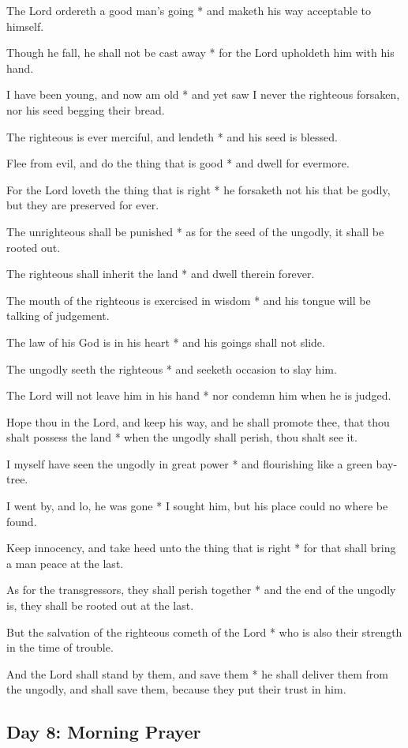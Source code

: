 The Lord ordereth a good man's going * and maketh his way acceptable to himself.

Though he fall, he shall not be cast away * for the Lord upholdeth him with his hand.

I have been young, and now am old * and yet saw I never the righteous forsaken, nor his seed begging their bread.

The righteous is ever merciful, and lendeth * and his seed is blessed.

Flee from evil, and do the thing that is good * and dwell for evermore.

For the Lord loveth the thing that is right * he forsaketh not his that be godly, but they are preserved for ever.

The unrighteous shall be punished * as for the seed of the ungodly, it shall be rooted out.

The righteous shall inherit the land * and dwell therein forever.

The mouth of the righteous is exercised in wisdom * and his tongue will be talking of judgement.

The law of his God is in his heart * and his goings shall not slide.

The ungodly seeth the righteous * and seeketh occasion to slay him.

The Lord will not leave him in his hand * nor condemn him when he is judged.

Hope thou in the Lord, and keep his way, and he shall promote thee, that thou shalt possess the land * when the ungodly shall perish, thou shalt see it.

I myself have seen the ungodly in great power * and flourishing like a green bay-tree.

I went by, and lo, he was gone * I sought him, but his place could no where be found.

Keep innocency, and take heed unto the thing that is right * for that shall bring a man peace at the last.

As for the transgressors, they shall perish together * and the end of the ungodly is, they shall be rooted out at the last.

But the salvation of the righteous cometh of the Lord * who is also their strength in the time of trouble.

And the Lord shall stand by them, and save them * he shall deliver them from the ungodly, and shall save them, because they put their trust in him.

\subsection{Day 8: Morning Prayer}

